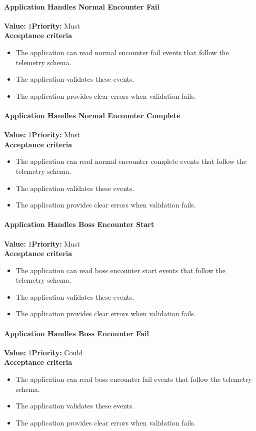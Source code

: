 \paragraph{Application Handles Normal Encounter Fail}
\textbf{Value:} 1\quad \textbf{Priority:} Must\\
\textbf{Acceptance criteria}
\begin{itemize}
  \item The application can read normal encounter fail events that follow the telemetry schema.
  \item The application validates these events.
  \item The application provides clear errors when validation fails.
\end{itemize}

\paragraph{Application Handles Normal Encounter Complete}
\textbf{Value:} 1\quad \textbf{Priority:} Must\\
\textbf{Acceptance criteria}
\begin{itemize}
  \item The application can read normal encounter complete events that follow the telemetry schema.
  \item The application validates these events.
  \item The application provides clear errors when validation fails.
\end{itemize}

\paragraph{Application Handles Boss Encounter Start}
\textbf{Value:} 1\quad \textbf{Priority:} Must\\
\textbf{Acceptance criteria}
\begin{itemize}
  \item The application can read boss encounter start events that follow the telemetry schema.
  \item The application validates these events.
  \item The application provides clear errors when validation fails.
\end{itemize}

\paragraph{Application Handles Boss Encounter Fail}
\textbf{Value:} 1\quad \textbf{Priority:} Could\\
\textbf{Acceptance criteria}
\begin{itemize}
  \item The application can read boss encounter fail events that follow the telemetry schema.
  \item The application validates these events.
  \item The application provides clear errors when validation fails.
\end{itemize}

